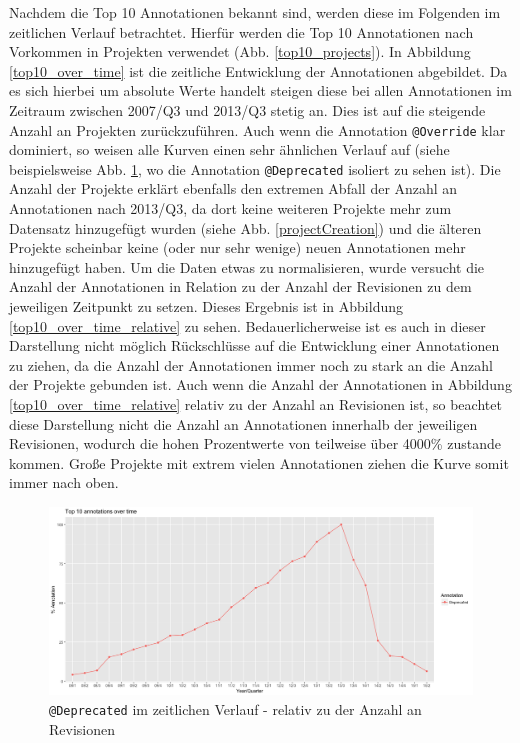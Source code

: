 \documentclass[11pt,a4paper,parskip=full]{scrartcl}
\begin{document}
Nachdem die Top 10 Annotationen bekannt sind, werden diese im Folgenden im zeitlichen Verlauf betrachtet. Hierfür werden die Top 10 Annotationen nach Vorkommen in Projekten verwendet (Abb. \ref{top10_projects}). In Abbildung \ref{top10_over_time} ist die zeitliche Entwicklung der Annotationen  abgebildet. Da es sich hierbei um absolute Werte handelt steigen diese bei allen Annotationen im Zeitraum zwischen 2007/Q3 und 2013/Q3 stetig an. Dies ist auf die steigende Anzahl an Projekten zurückzuführen. Auch wenn die Annotation \texttt{@Override} klar dominiert, so weisen alle Kurven einen sehr ähnlichen Verlauf auf (siehe beispielsweise Abb. \ref{deprecated}, wo die Annotation \texttt{@Deprecated} isoliert zu sehen ist). Die Anzahl der Projekte erklärt ebenfalls den extremen Abfall der Anzahl an Annotationen nach 2013/Q3, da dort keine weiteren Projekte mehr zum Datensatz hinzugefügt wurden (siehe Abb. \ref{projectCreation}) und die älteren Projekte scheinbar keine (oder nur sehr wenige) neuen Annotationen mehr hinzugefügt haben. Um die Daten etwas zu normalisieren, wurde versucht die Anzahl der Annotationen in Relation zu der Anzahl der Revisionen zu dem jeweiligen Zeitpunkt zu setzen. Dieses Ergebnis ist in Abbildung \ref{top10_over_time_relative} zu sehen. Bedauerlicherweise ist es auch in dieser Darstellung nicht möglich Rückschlüsse auf die Entwicklung einer Annotationen zu ziehen, da die Anzahl der Annotationen immer noch zu stark an die Anzahl der Projekte gebunden ist. Auch wenn die Anzahl der Annotationen in Abbildung \ref{top10_over_time_relative} relativ zu der Anzahl an Revisionen ist, so beachtet diese Darstellung nicht die Anzahl an Annotationen innerhalb der jeweiligen Revisionen, wodurch die hohen Prozentwerte von teilweise über 4000\% zustande kommen. Große Projekte mit extrem vielen Annotationen ziehen die Kurve somit immer nach oben.\par

\begin{figure}
	\centering
	\includegraphics[width=\textwidth]{plots/deprecated.png}
	\caption{\texttt{@Deprecated} im zeitlichen Verlauf - relativ zu der Anzahl an Revisionen}
	\label{deprecated}
\end{figure}
\end{document}
